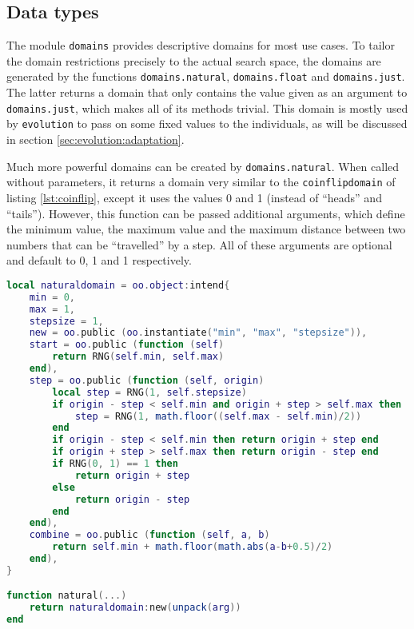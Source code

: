 \subsection{Data types}
\label{sec:evolution:domains:data}

The module \texttt{domains} provides descriptive domains for most use cases. To tailor the domain restrictions precisely to the actual search space, the domains are generated by the functions \texttt{domains.natural}, \texttt{domains.float} and \texttt{domains.just}. The latter returns a domain that only contains the value given as an argument to \texttt{domains.just}, which makes all of its methods trivial. This domain is mostly used by \texttt{evolution} to pass on some fixed values to the individuals, as will be discussed in section \ref{sec:evolution:adaptation}.

Much more powerful domains can be created by \texttt{domains.natural}. When called without parameters, it returns a domain very similar to the \texttt{coinflipdomain} of listing \ref{lst:coinflip}, except it uses the values 0 and 1 (instead of ``heads'' and ``tails''). However, this function can be passed additional arguments, which define the minimum value, the maximum value and the maximum distance between two numbers that can be ``travelled'' by a step. All of these arguments are optional and default to 0, 1 and 1 respectively.

\begin{lstlisting}[language=lua, caption={Defintion of \texttt{domains.natural}}, label=lst:natural, name=lst:natural]
local naturaldomain = oo.object:intend{
    min = 0,
    max = 1,
    stepsize = 1,
    new = oo.public (oo.instantiate("min", "max", "stepsize")),
    start = oo.public (function (self)
        return RNG(self.min, self.max)
    end),
    step = oo.public (function (self, origin)
        local step = RNG(1, self.stepsize)
        if origin - step < self.min and origin + step > self.max then
            step = RNG(1, math.floor((self.max - self.min)/2))
        end
        if origin - step < self.min then return origin + step end
        if origin + step > self.max then return origin - step end
        if RNG(0, 1) == 1 then
            return origin + step
        else
            return origin - step
        end
    end),
    combine = oo.public (function (self, a, b)
        return self.min + math.floor(math.abs(a-b+0.5)/2)
    end),
}

function natural(...)
    return naturaldomain:new(unpack(arg))
end
\end{lstlisting}

